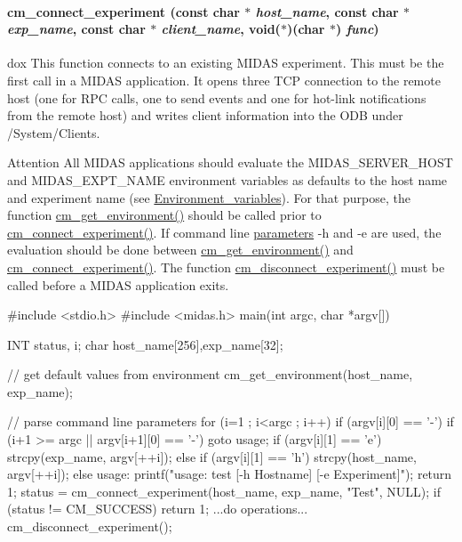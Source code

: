 \paragraph[{cm\_\-connect\_\-experiment}]{ cm\_\-connect\_\-experiment (const char $\ast$ {\em host\_\-name}, \/  const char $\ast$ {\em exp\_\-name}, \/  const char $\ast$ {\em client\_\-name}, \/  void($\ast$)(char $\ast$) {\em func})}\hfill\label{group__cmfunctionc_ga1e96495bb5b89e4ea770a1ea7bc7787b}
dox This function connects to an existing MIDAS experiment. This must be the first call in a MIDAS application. It opens three TCP connection to the remote host (one for RPC calls, one to send events and one for hot-\/link notifications from the remote host) and writes client information into the ODB under /System/Clients. \begin{DoxyAttention}{Attention}
All MIDAS applications should evaluate the MIDAS\_\-SERVER\_\-HOST and MIDAS\_\-EXPT\_\-NAME environment variables as defaults to the host name and experiment name (see \hyperlink{BuildingOptions_Environment_variables}{Environment\_\-variables}). For that purpose, the function \hyperlink{group__cmfunctionc_gaa483e7c17ff962fd6cdfa581f4989f54}{cm\_\-get\_\-environment()} should be called prior to \hyperlink{group__cmfunctionc_ga1e96495bb5b89e4ea770a1ea7bc7787b}{cm\_\-connect\_\-experiment()}. If command line \hyperlink{structparameters}{parameters} -\/h and -\/e are used, the evaluation should be done between \hyperlink{group__cmfunctionc_gaa483e7c17ff962fd6cdfa581f4989f54}{cm\_\-get\_\-environment()} and \hyperlink{group__cmfunctionc_ga1e96495bb5b89e4ea770a1ea7bc7787b}{cm\_\-connect\_\-experiment()}. The function \hyperlink{group__cmfunctionc_ga7d5a287821786e8dde3d2340826215b2}{cm\_\-disconnect\_\-experiment()} must be called before a MIDAS application exits. 
\begin{DoxyCode}
#include <stdio.h>
#include <midas.h>
main(int argc, char *argv[])
{
  INT  status, i;
  char host_name[256],exp_name[32];

  // get default values from environment
  cm_get_environment(host_name, exp_name);

  // parse command line parameters
  for (i=1 ; i<argc ; i++)
    {
    if (argv[i][0] == '-')
      {
      if (i+1 >= argc || argv[i+1][0] == '-')
        goto usage;
      if (argv[i][1] == 'e')
        strcpy(exp_name, argv[++i]);
      else if (argv[i][1] == 'h')
        strcpy(host_name, argv[++i]);
      else
        {
usage:
        printf("usage: test [-h Hostname] [-e Experiment]\n\n");
        return 1;
        }
      }
    }
  status = cm_connect_experiment(host_name, exp_name, "Test", NULL);
  if (status != CM_SUCCESS)
    return 1;
  ...do operations...
  cm_disconnect_experiment();
}
\end{DoxyCode}
 
\end{DoxyAttention}

